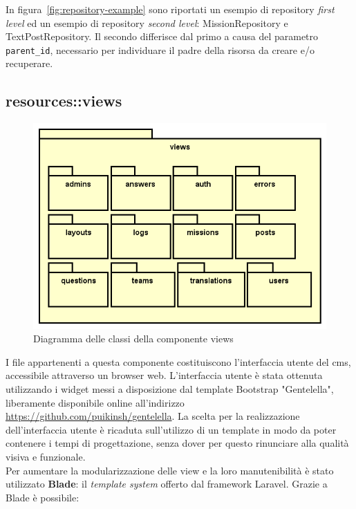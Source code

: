 In figura~\ref{fig:repository-example} sono riportati un esempio di repository \textit{first level} ed un esempio di repository \textit{second level}: MissionRepository e TextPostRepository. Il secondo differisce dal primo a causa del parametro \verb!parent_id!, necessario per individuare il padre della risorsa da creare e/o recuperare.

\subsection{resources::views} %

\begin{figure}[H]
	\centering
  \includegraphics[scale=0.7]{immagini/components/views_diagram.png}
  \caption{Diagramma delle classi della componente views}
	\label{fig:views} 
\end{figure}

I file appartenenti a questa componente costituiscono l'interfaccia utente del \gls{cms}\glsfirstoccur{}, accessibile attraverso un browser web. L'interfaccia utente è stata ottenuta utilizzando i widget messi a disposizione dal template Bootstrap "Gentelella", liberamente disponibile online all'indirizzo \url{https://github.com/puikinsh/gentelella}. La scelta per la realizzazione dell'interfaccia utente è ricaduta sull'utilizzo di un template in modo da poter contenere i tempi di progettazione, senza dover per questo rinunciare alla qualità visiva e funzionale.\\

Per aumentare la modularizzazione delle view e la loro manutenibilità è stato utilizzato \textbf{Blade}: il \textit{template system} offerto dal framework Laravel. Grazie a Blade è possibile: 

